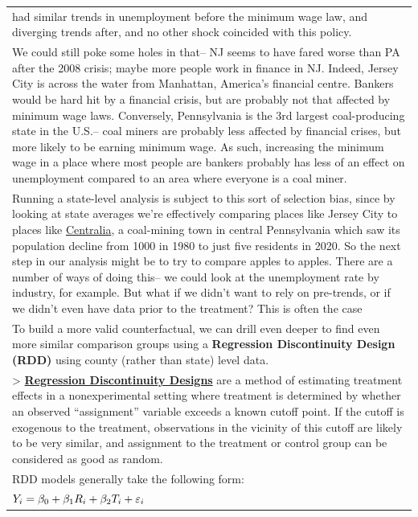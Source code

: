 \documentclass[
  letterpaper,
  DIV=11,
  numbers=noendperiod]{scrreprt}
\begin{document}
\begin{longtable}[]{@{}
  >{\raggedright\arraybackslash}p{}@{}}
had similar trends in unemployment before the minimum wage law, and
diverging trends after, and no other shock coincided with this
policy. \\
We could still poke some holes in that-- NJ seems to have fared worse
than PA after the 2008 crisis; maybe more people work in finance in NJ.
Indeed, Jersey City is across the water from Manhattan, America's
financial centre. Bankers would be hard hit by a financial crisis, but
are probably not that affected by minimum wage laws. Conversely,
Pennsylvania is the 3rd largest coal-producing state in the U.S.-- coal
miners are probably less affected by financial crises, but more likely
to be earning minimum wage. As such, increasing the minimum wage in a
place where most people are bankers probably has less of an effect on
unemployment compared to an area where everyone is a coal miner. \\
Running a state-level analysis is subject to this sort of selection
bias, since by looking at state averages we're effectively comparing
places like Jersey City to places like
\href{https://en.wikipedia.org/wiki/Centralia,_Pennsylvania}{Centralia},
a coal-mining town in central Pennsylvania which saw its population
decline from 1000 in 1980 to just five residents in 2020. So the next
step in our analysis might be to try to compare apples to apples. There
are a number of ways of doing this-- we could look at the unemployment
rate by industry, for example. But what if we didn't want to rely on
pre-trends, or if we didn't even have data prior to the treatment? This
is often the case \\
To build a more valid counterfactual, we can drill even deeper to find
even more similar comparison groups using a \textbf{Regression
Discontinuity Design (RDD)} using county (rather than state) level
data. \\
\textgreater{}
\textbf{\href{https://www.princeton.edu/~davidlee/wp/RDDEconomics.pdf}{Regression
Discontinuity Designs}} are a method of estimating treatment effects in
a nonexperimental setting where treatment is determined by whether an
observed ``assignment'' variable exceeds a known cutoff point. If the
cutoff is exogenous to the treatment, observations in the vicinity of
this cutoff are likely to be very similar, and assignment to the
treatment or control group can be considered as good as random. \\
RDD models generally take the following form: \\
\(\huge Y_{i} = \beta_0 + \beta_1 R_i + \beta_2 T_i + \varepsilon_{i}\) \\

\end{longtable}
\end{document}
